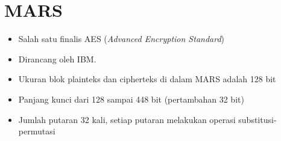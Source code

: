 \documentclass{article}
\begin{document}

\section*{MARS}

\begin{itemize}
    \item Salah satu finalis AES (\textit{Advanced Encryption Standard})
    \item Dirancang oleh IBM.
    \item Ukuran blok plainteks dan cipherteks di dalam MARS adalah 128 bit
    \item Panjang kunci dari 128 sampai 448 bit (pertambahan 32 bit)
    \item Jumlah putaran 32 kali, setiap putaran melakukan operasi substitusi-permutasi
\end{itemize}
\end{document}
